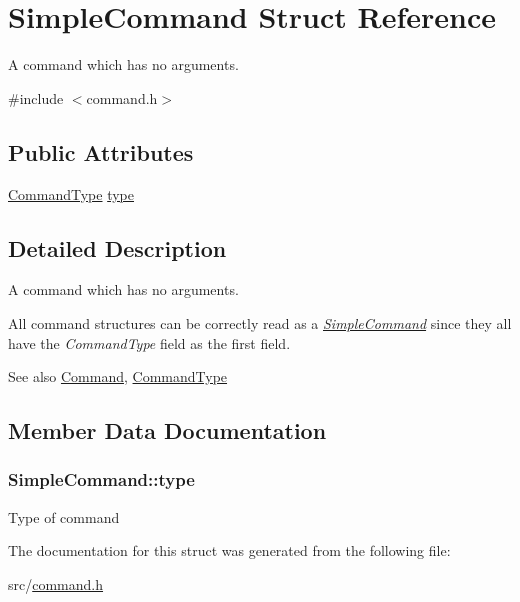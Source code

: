 \hypertarget{structSimpleCommand}{}\section{Simple\+Command Struct Reference}
\label{structSimpleCommand}


A command which has no arguments.  




{\ttfamily \#include $<$command.\+h$>$}

\subsection*{Public Attributes}
\begin{DoxyCompactItemize}
\item 
\hyperlink{command_8h_a21e038f5b8958e203d28bc4f18472352}{Command\+Type} \hyperlink{structSimpleCommand_a9048c04ff50ab9364d56e04e5c3e8ee0}{type}
\end{DoxyCompactItemize}


\subsection{Detailed Description}
A command which has no arguments. 

All command structures can be correctly read as a {\itshape \hyperlink{structSimpleCommand}{Simple\+Command}} since they all have the {\itshape Command\+Type} field as the first field.

\begin{DoxySeeAlso}{See also}
\hyperlink{unionCommand}{Command}, \hyperlink{command_8h_aa8311e0de296df9816965be35c31d925}{Command\+Type} 
\end{DoxySeeAlso}


\subsection{Member Data Documentation}
\subsubsection[{\texorpdfstring{type}{type}}]{ Simple\+Command\+::type}\hypertarget{structSimpleCommand_a9048c04ff50ab9364d56e04e5c3e8ee0}{}\label{structSimpleCommand_a9048c04ff50ab9364d56e04e5c3e8ee0}
Type of command 

The documentation for this struct was generated from the following file\+:\begin{DoxyCompactItemize}
\item 
src/\hyperlink{command_8h}{command.\+h}\end{DoxyCompactItemize}
